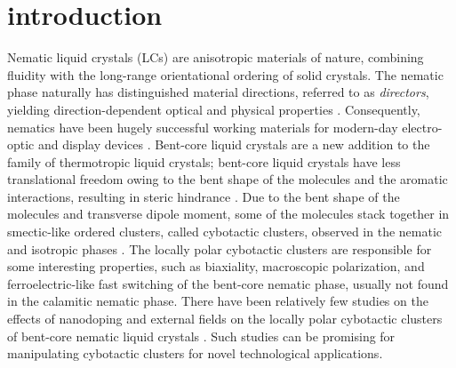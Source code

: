 \documentclass[reprint,amsfonts,amsmath,amssymb,aps,pre,floatfix,10pt]{revtex4-1}
\begin{document}
\section{introduction}
Nematic liquid crystals (LCs) are anisotropic materials of nature, combining fluidity with the long-range orientational ordering of solid crystals. The nematic phase naturally has distinguished material directions, referred to as \emph{directors}, yielding direction-dependent optical and physical properties \cite{de1993physics_2}. Consequently, nematics have been hugely successful working materials for modern-day electro-optic and display devices \cite{collings2019introduction_1, de1993physics_2}. Bent-core liquid crystals are a new addition to the family of thermotropic liquid crystals; bent-core liquid crystals have less translational freedom owing to the bent shape of the molecules and the aromatic interactions, resulting in steric hindrance \cite{marino2012dielectric_3, ghosh2014ferroelectric_4}. Due to the bent shape of the molecules and transverse dipole moment, some of the molecules stack together in smectic-like ordered clusters, called cybotactic clusters, observed in the nematic and isotropic phases \cite{bailey2009rheological_5}. The locally polar cybotactic clusters are responsible for some interesting properties, such as biaxiality, macroscopic polarization, and ferroelectric-like fast switching \cite{takezoe2006bent_6, francescangeli2014cybotactic_7, keith2010nematic_8, kumar2018ferroelectric_9} of the bent-core nematic phase, usually not found in the calamitic nematic phase. There have been relatively few studies on the effects of nanodoping and external fields on the locally polar cybotactic clusters of bent-core nematic liquid crystals \cite{kumar2018quantum_10,khan2017elastic_11,kumar2018nanodoping_12}. Such studies can be promising for manipulating cybotactic clusters for novel technological applications.
\end{document}

